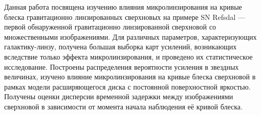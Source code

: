 Данная работа посвящена изучению влияния микролинзирования на кривые блеска гравитационно линзированных сверхновых на примере SN Refsdal — первой обнаруженной гравитационно линзированной сверхновой со множественными изображениями. Для различных параметров, характеризующих галактику-линзу, получена большая выборка карт усилений, возникающих вследствие только эффекта микролинзирования, и проведено их статистическое исследование. Построены распределения вероятности усиления в звездных величинах, изучено влияние микролинзирования на кривые блеска сверхновой в рамках модели расширяющегося диска с постоянной поверхностной яркостью. Получены оценки дисперсии временной задержки между изображениями сверхновой в зависимости от момента начала наблюдения её кривой блеска.
